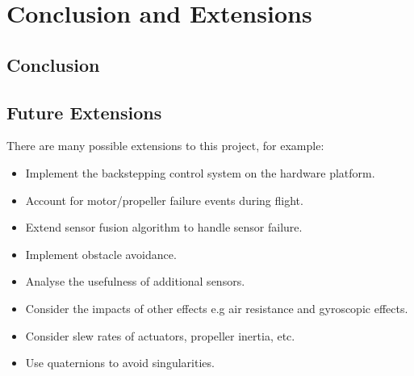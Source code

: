 
\chapter{Conclusion and Extensions}

\section{Conclusion}

\section{Future Extensions}
There are many possible extensions to this project, for example:

\begin{itemize}
\item Implement the backstepping control system on the hardware platform.\\
\item Account for motor/propeller failure events during flight.\\
\item Extend sensor fusion algorithm to handle sensor failure.\\
\item Implement obstacle avoidance.\\
\item Analyse the usefulness of additional sensors.\\
\item Consider the impacts of other effects e.g air resistance and gyroscopic effects.\\
\item Consider slew rates of actuators, propeller inertia, etc.\\
\item Use quaternions to avoid singularities.


\end{itemize}

\clearpage


